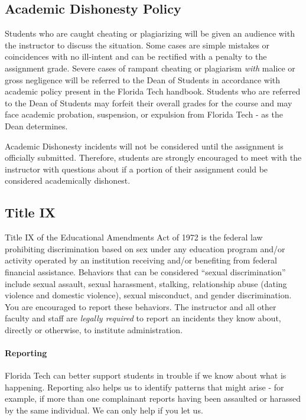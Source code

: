 \documentclass[
	letterpaper, %
	fontsize=10pt, %
	twoside=true, %
	numbers=noenddot, %
]{kaobook}
\begin{document}
\subsection*{Academic Dishonesty Policy} \label{ssec:academic_dishonesty}
Students who are caught cheating or plagiarizing will be given an audience with the instructor to discuss the situation. 
Some cases are simple mistakes or coincidences with no ill-intent and can be rectified with a penalty to the assignment grade.
Severe cases of rampant cheating or plagiarism \emph{with} malice or gross negligence will be referred to the Dean of Students in accordance with academic policy present in the Florida Tech handbook.
Students who are referred to the Dean of Students may forfeit their overall grades for the course and may face academic probation, suspension, or expulsion from Florida Tech - as the Dean determines.

Academic Dishonesty incidents will not be considered until the assignment is officially submitted. 
Therefore, students are strongly encouraged to meet with the instructor with questions about if a portion of their assignment could be considered academically dishonest.

\subsection*{Title IX} \label{ssec:title_ix}
Title IX of the Educational Amendments Act of 1972 is the federal law prohibiting discrimination based on sex under any education program and/or activity operated by an institution receiving and/or benefiting from federal financial assistance. Behaviors that can be considered “sexual discrimination” include sexual assault, sexual harassment, stalking, relationship abuse (dating violence and domestic violence), sexual misconduct, and gender discrimination. You are encouraged to report these behaviors. The instructor and all other faculty and staff are \emph{legally required} to report an incidents they know about, directly or otherwise, to institute administration.

\paragraph*{Reporting} Florida Tech can better support students in trouble if we know about what is happening.  Reporting also helps us to identify patterns that might arise - for example, if more than one complainant reports having been assaulted or harassed by the same individual. We can only help if you let us.
\end{document}
